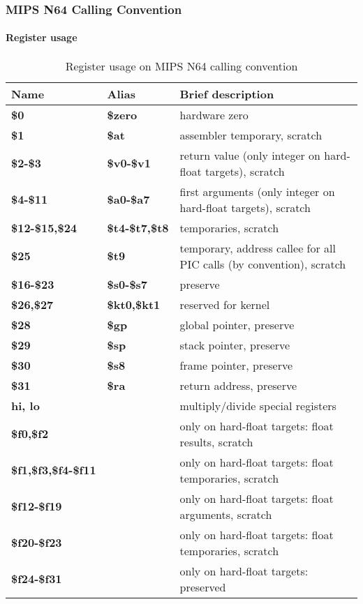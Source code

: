 \subsubsection{MIPS N64 Calling Convention}

\paragraph{Register usage}

\begin{table}[h]
\begin{tabular*}{0.95\textwidth}{lll}
Name                       & Alias                & Brief description\\
\hline
{\bf \$0}                  & {\bf \$zero}         & hardware zero \\
{\bf \$1}                  & {\bf \$at}           & assembler temporary, scratch \\
{\bf \$2-\$3}              & {\bf \$v0-\$v1}      & return value (only integer on hard-float targets), scratch \\
{\bf \$4-\$11}             & {\bf \$a0-\$a7}      & first arguments (only integer on hard-float targets), scratch \\
{\bf \$12-\$15,\$24}       & {\bf \$t4-\$t7,\$t8} & temporaries, scratch \\
{\bf \$25}                 & {\bf \$t9}           & temporary, address callee for all PIC calls (by convention), scratch \\
{\bf \$16-\$23}            & {\bf \$s0-\$s7}      & preserve \\
{\bf \$26,\$27}            & {\bf \$kt0,\$kt1}    & reserved for kernel \\
{\bf \$28}                 & {\bf \$gp}           & global pointer, preserve \\
{\bf \$29}                 & {\bf \$sp}           & stack pointer, preserve \\
{\bf \$30}                 & {\bf \$s8}           & frame pointer, preserve \\
{\bf \$31}                 & {\bf \$ra}           & return address, preserve \\
{\bf hi, lo}               &                      & multiply/divide special registers \\
{\bf \$f0,\$f2}            &                      & only on hard-float targets: float results, scratch \\
{\bf \$f1,\$f3,\$f4-\$f11} &                      & only on hard-float targets: float temporaries, scratch \\
{\bf \$f12-\$f19}          &                      & only on hard-float targets: float arguments, scratch \\
{\bf \$f20-\$f23}          &                      & only on hard-float targets: float temporaries, scratch \\
{\bf \$f24-\$f31}          &                      & only on hard-float targets: preserved \\
\end{tabular*}
\caption{Register usage on MIPS N64 calling convention}
\end{table}

